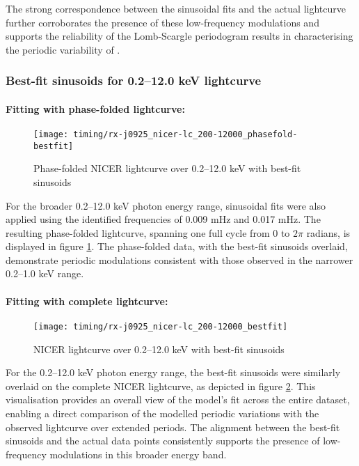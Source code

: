 				The strong correspondence between the sinusoidal fits and the actual lightcurve further corroborates the presence of these low-frequency modulations and supports the reliability of the Lomb-Scargle periodogram results in characterising the periodic variability of \source.
				
			\subsubsection{Best-fit sinusoids for 0.2--12.0 keV lightcurve}
				\paragraph{Fitting with phase-folded lightcurve:}				
				\begin{figure}[h!]
					\centering
					\texttt{[image: timing/rx-j0925\_nicer-lc\_200-12000\_phasefold-bestfit]}
					\caption{Phase-folded NICER lightcurve over 0.2--12.0 keV with best-fit sinusoids}
					\label{result:lc-phase-fold-mrvel-nicer:200-12000-bestfit}
				\end{figure}
				For the broader 0.2--12.0 keV photon energy range, sinusoidal fits were also applied using the identified frequencies of 0.009 mHz and 0.017 mHz. The resulting phase-folded lightcurve, spanning one full cycle from 0 to $2\pi$ radians, is displayed in figure \ref{result:lc-phase-fold-mrvel-nicer:200-12000-bestfit}. The phase-folded data, with the best-fit sinusoids overlaid, demonstrate periodic modulations consistent with those observed in the narrower 0.2--1.0 keV range. %
				
				\paragraph{Fitting with complete lightcurve:}
				\begin{figure}[h!]
					\centering
					\texttt{[image: timing/rx-j0925\_nicer-lc\_200-12000\_bestfit]}
					\caption{NICER lightcurve over 0.2--12.0 keV with best-fit sinusoids}
					\label{result:lc-mrvel-nicer:200-12000-bestfit}
				\end{figure}
				For the 0.2--12.0 keV photon energy range, the best-fit sinusoids were similarly overlaid on the complete NICER lightcurve, as depicted in figure \ref{result:lc-mrvel-nicer:200-12000-bestfit}. This visualisation provides an overall view of the model's fit across the entire dataset, enabling a direct comparison of the modelled periodic variations with the observed lightcurve over extended periods. The alignment between the best-fit sinusoids and the actual data points consistently supports the presence of low-frequency modulations in this broader energy band.
				
